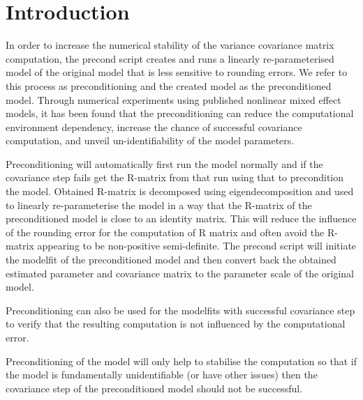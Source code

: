 
\usepackage{color}
\usepackage{amsmath}
\usepackage{tikz}
\usetikzlibrary{shapes,arrows}




\maketitle

\section{Introduction}

In order to increase the numerical stability of the variance covariance matrix computation, the precond script creates and runs a linearly re-parameterised model of the original model that is less sensitive to rounding errors.  We refer to this process as preconditioning and the created model as the preconditioned model.  Through numerical experiments\cite{Aoki} using published nonlinear mixed effect models, it has been found that the preconditioning can reduce the computational environment dependency, increase the chance of successful covariance computation, and unveil un-identifiability of the model parameters.

Preconditioning will automatically first run the model normally and if the covariance step fails get the R-matrix from that run using that to precondition the model. Obtained R-matrix is decomposed using eigendecomposition and used to linearly re-parameterise the model in a way that the R-matrix of the preconditioned model is close to an identity matrix.  This will reduce the influence of the rounding error for the computation of R matrix and often avoid the R-matrix appearing to be non-positive semi-definite.  The precond script will initiate the modelfit of the preconditioned model and then convert back the obtained estimated parameter and covariance matrix to the parameter scale of the original model.

Preconditioning can also be used for the modelfits with successful covariance step to verify that the resulting computation is not influenced by the computational error.

Preconditioning of the model will only help to stabilise the computation so that if the model is fundamentally unidentifiable (or have other issues) then the covariance step of the preconditioned model should not be successful.\\


